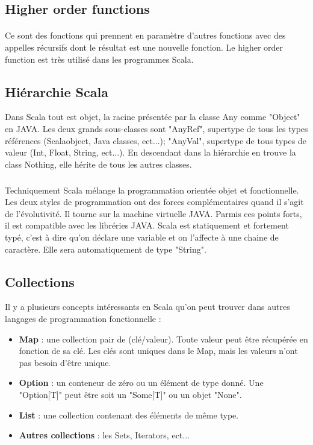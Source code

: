 \subsection{Higher order functions}
\paragraph{}
Ce sont des fonctions qui prennent en paramètre d'autres fonctions avec des appelles récursifs dont le résultat est une nouvelle fonction.
Le higher order function est très utilisé dans les programmes Scala.
\subsection{Hiérarchie Scala}
Dans Scala tout est objet, la racine présentée par la classe Any comme "Object" en JAVA.
Les deux grands sous-classes sont "AnyRef", supertype de tous les types références (Scalaobject, Java classes, ect...);
"AnyVal", supertype de tous types de valeur (Int, Float, String, ect...).
En descendant dans la hiérarchie en trouve la class Nothing, elle hérite de tous les autres classes.
\subparagraph{}
Techniquement Scala mélange la programmation orientée objet et fonctionnelle. Les deux styles de programmation ont des forces complémentaires quand il s'agit de l'évolutivité. Il tourne sur la machine virtuelle JAVA. Parmis ces points forts, il est compatible avec les libréries JAVA.
Scala est statiquement et fortement typé, c'est à dire qu'on déclare une variable et on l'affecte à une chaine de caractère. Elle sera automatiquement de type "String".
\subsection{Collections}
Il y a plusieurs concepts intéressants en Scala qu'on peut trouver dans autres langages de programmation fonctionnelle :
\begin{itemize}
\item \textbf{Map} : une collection pair de (clé/valeur). Toute valeur peut être récupérée en fonction de sa clé. Les clés sont uniques dans le Map, mais les valeurs n'ont pas besoin d'être unique.
\item \textbf{Option} : un conteneur de zéro ou un élément de type donné. Une "Option[T]" peut être soit un "Some[T]" ou un objet "None".
\item \textbf{List} : une collection contenant des éléments de même type. 
\item \textbf{Autres collections } : les Sets, Iterators, ect...
\end{itemize}
